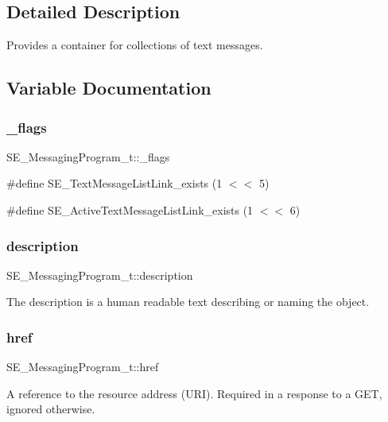 \subsection{Detailed Description}
Provides a container for collections of text messages. 

\subsection{Variable Documentation}
\mbox{\label{group__MessagingProgram_ga42f850441cf2c04e986da12014095d29}} 
\subsubsection{\texorpdfstring{\+\_\+flags}{\_flags}}
{\footnotesize\ttfamily S\+E\+\_\+\+Messaging\+Program\+\_\+t\+::\+\_\+flags}

\#define S\+E\+\_\+\+Text\+Message\+List\+Link\+\_\+exists (1 $<$$<$ 5)

\#define S\+E\+\_\+\+Active\+Text\+Message\+List\+Link\+\_\+exists (1 $<$$<$ 6) \mbox{\label{group__MessagingProgram_gaac179189b467239471e30bb4fc54ed82}} 
\subsubsection{\texorpdfstring{description}{description}}
{\footnotesize\ttfamily S\+E\+\_\+\+Messaging\+Program\+\_\+t\+::description}

The description is a human readable text describing or naming the object. \mbox{\label{group__MessagingProgram_ga1eb751e532e2b3d1a8ddabe4a2d010f8}} 
\subsubsection{\texorpdfstring{href}{href}}
{\footnotesize\ttfamily S\+E\+\_\+\+Messaging\+Program\+\_\+t\+::href}

A reference to the resource address (U\+RI). Required in a response to a G\+ET, ignored otherwise. \mbox{\label{group__MessagingProgram_ga57da8d224c245d4abf36172470de4c00}} 
